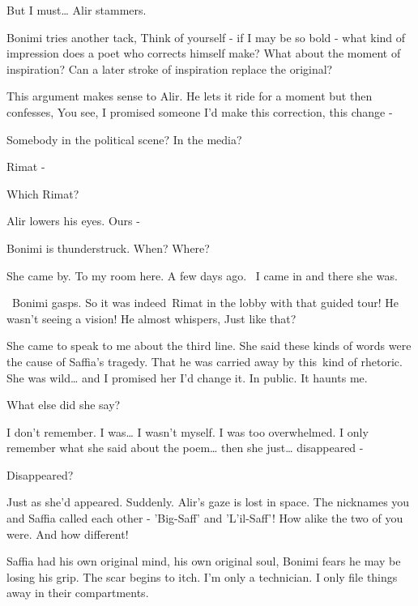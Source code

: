 \documentclass[12pt]{book}
\begin{document}
{\textquotedbl}But I must{\dots}{\textquotedbl} Alir stammers.

Bonimi tries another tack, {\textquotedbl}Think of yourself - if I may be so bold - what kind of impression does a poet
who corrects himself make? What about the moment of inspiration? Can a later stroke of inspiration replace the
original?{\textquotedbl}

This argument makes sense to Alir. He lets it ride for a moment but then confesses, {\textquotedbl}You see, I promised
someone I'd make this correction, this change -{\textquotedbl}

{\textquotedbl}Somebody in the political scene? In the media?{\textquotedbl}

{\textquotedbl}Rimat -{\textquotedbl}

{\textquotedbl}Which Rimat?{\textquotedbl}

Alir lowers his eyes. {\textquotedbl}Ours -{\textquotedbl}

Bonimi is thunderstruck. {\textquotedbl}When? Where?{\textquotedbl}

{\textquotedbl}She came by. To my room here. A few days ago. ~I came in and there she was.{\textquotedbl}

~Bonimi gasps. So it was indeed~Rimat in the lobby with that guided tour! He wasn't seeing a vision! He almost whispers,
{\textquotedbl}Just like that?{\textquotedbl}

{\textquotedbl}She came to speak to me about the third line. She said these kinds of words were the cause of Saffia's
tragedy. That he was carried away by this~kind of{ }rhetoric. She was wild{\dots} and I promised her I'd
change it. In public. It haunts me.{\textquotedbl}

{\textquotedbl}What else did she say?{\textquotedbl}

{\textquotedbl}I don't remember. I was{\dots} I wasn't myself. I was too overwhelmed. I only remember what she said
about the poem{\dots} then she just{\dots} disappeared -{\textquotedbl}

{\textquotedbl}Disappeared?{\textquotedbl}

{\textquotedbl}Just as she'd appeared. Suddenly.{\textquotedbl} Alir's gaze is lost in space. {\textquotedbl}The
nicknames you and Saffia called each other - 'Big-Saff' and 'L'il-Saff'! How alike the two of you were. And how
different!{\textquotedbl}

{\textquotedbl}Saffia had his own original mind, his own original soul,{\textquotedbl} Bonimi fears he may be losing his
grip. The scar begins to itch. {\textquotedbl}I'm only a technician. I only file things away in their
compartments.{\textquotedbl}
\end{document}
